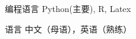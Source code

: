 

\begin{cvskills}




  \cvskill
    {编程语言} %
    {Python(主要), R, Latex} %

  \cvskill
    {语言} %
    {中文（母语），英语（熟练）} %

\end{cvskills}
